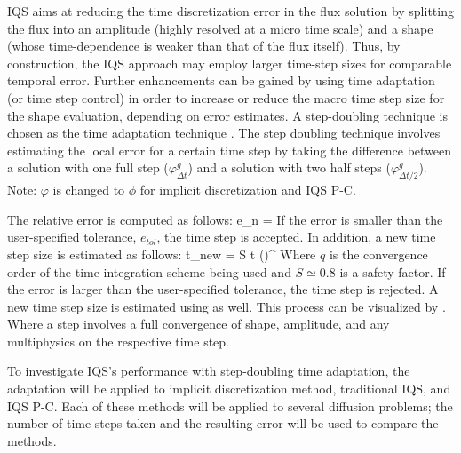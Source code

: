 IQS aims at reducing the time discretization error in the flux solution by splitting the flux into an amplitude (highly resolved at a micro time scale) and a shape (whose time-dependence is weaker than that of the flux itself). Thus, by construction, the IQS approach may employ larger time-step sizes for comparable temporal error. Further enhancements can be gained by using time adaptation (or time step control) in order to increase or reduce the macro time step size for the shape evaluation, depending on error estimates. A step-doubling technique is chosen as the time adaptation technique \cite{NumC}. The step doubling technique involves estimating the local error for a certain time step by taking the difference between a solution with one full step ($\varphi^g_{\Delta t}$) and a solution with two half steps ($\varphi^g_{\Delta t/2}$). Note: $\varphi$ is changed to $\phi$ for implicit discretization and IQS P-C.

The relative error is computed as follows:
\be
e_n = 
\label{eq:edt2}
\ee
If the error is smaller than the user-specified tolerance, $e_{tol}$, the time step is accepted. In addition, a new time step size is estimated as follows:
\be
\Delta t_{new} = S \Delta t \left(\right)^{}
\label{eq:dt2}
\ee
Where $q$ is the convergence order of the time integration scheme being used and $S\simeq 0.8$ is a safety factor. If the error is larger than the user-specified tolerance, the time step is rejected. A new time step size is estimated using   as well. This process can be visualized by .  Where a step involves a full convergence of shape, amplitude, and any multiphysics on the respective time step.

To investigate IQS's performance with step-doubling time adaptation, the adaptation will be applied to implicit discretization method, traditional IQS, and IQS P-C.  Each of these methods will be applied to several diffusion problems; the number of time steps taken and the resulting error will be used to compare the methods.

